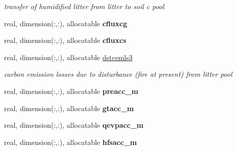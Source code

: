 \begin{DoxyCompactItemize}
\begin{DoxyCompactList}\small\item\em transfer of humidified litter from litter to soil c pool \end{DoxyCompactList}\item 
\hypertarget{structctem__statevars_1_1veg__rot_a96267c75083a76bc2217711b06c502fb}{}real, dimension(\+:,\+:), allocatable {\bfseries cfluxcg}\label{structctem__statevars_1_1veg__rot_a96267c75083a76bc2217711b06c502fb}

\item 
\hypertarget{structctem__statevars_1_1veg__rot_a0823301275d2c66c951ab3e973ae8e7e}{}real, dimension(\+:,\+:), allocatable {\bfseries cfluxcs}\label{structctem__statevars_1_1veg__rot_a0823301275d2c66c951ab3e973ae8e7e}

\item 
\hypertarget{structctem__statevars_1_1veg__rot_a8d1a9faebc6034c432dfb6e6cd3817bd}{}real, dimension(\+:,\+:), allocatable \hyperlink{structctem__statevars_1_1veg__rot_a8d1a9faebc6034c432dfb6e6cd3817bd}{dstcemls3}\label{structctem__statevars_1_1veg__rot_a8d1a9faebc6034c432dfb6e6cd3817bd}

\begin{DoxyCompactList}\small\item\em carbon emission losses due to disturbance (fire at present) from litter pool \end{DoxyCompactList}\item 
\hypertarget{structctem__statevars_1_1veg__rot_af3d24c5ca56a34363664c949a8abb4cc}{}real, dimension(\+:,\+:), allocatable {\bfseries preacc\+\_\+m}\label{structctem__statevars_1_1veg__rot_af3d24c5ca56a34363664c949a8abb4cc}

\item 
\hypertarget{structctem__statevars_1_1veg__rot_ada1a76d40177e3ab21ff6fb4a6e469a5}{}real, dimension(\+:,\+:), allocatable {\bfseries gtacc\+\_\+m}\label{structctem__statevars_1_1veg__rot_ada1a76d40177e3ab21ff6fb4a6e469a5}

\item 
\hypertarget{structctem__statevars_1_1veg__rot_aa8a45da667f998ddb5d0a54eabc72b76}{}real, dimension(\+:,\+:), allocatable {\bfseries qevpacc\+\_\+m}\label{structctem__statevars_1_1veg__rot_aa8a45da667f998ddb5d0a54eabc72b76}

\item 
\hypertarget{structctem__statevars_1_1veg__rot_a8d454776c11d959d8cb6433b4fd775d7}{}real, dimension(\+:,\+:), allocatable {\bfseries hfsacc\+\_\+m}\label{structctem__statevars_1_1veg__rot_a8d454776c11d959d8cb6433b4fd775d7}


\end{DoxyCompactItemize}

